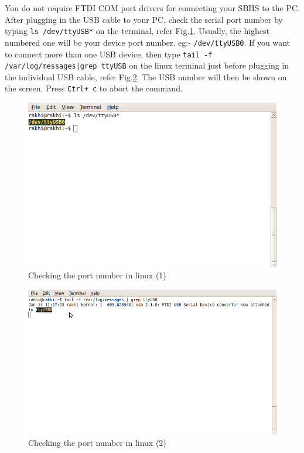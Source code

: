 \documentclass[12pt]{report}
\begin{document}
You do not require FTDI COM port drivers for connecting your SBHS to the PC. After plugging in the USB cable to your PC, check the serial port number by typing {\tt ls /dev/ttyUSB*} on the terminal, refer Fig.\ref{lstty}. Usually, the highest numbered one will be your device port number. eg:- {\tt /dev/ttyUSB0}. If you want to connect more than one USB device, then type {\tt tail -f /var/log/messages|grep ttyUSB} on the linux terminal just before plugging in the individual USB cable, refer Fig.\ref{tailusb}. The USB number will then be shown on the screen. Press {\tt Ctrl+ c} to abort the command. 
\begin{figure}
\centering
\includegraphics[width=0.7\linewidth]{lstty.png}
\caption{Checking the port number in linux (1)}
\label{lstty}
\end{figure}
\begin{figure}
\centering
\includegraphics[width=0.7\linewidth]{tailusb.png}
\caption{Checking the port number in linux (2)}
\label{tailusb}
\end{figure}
\end{document}
